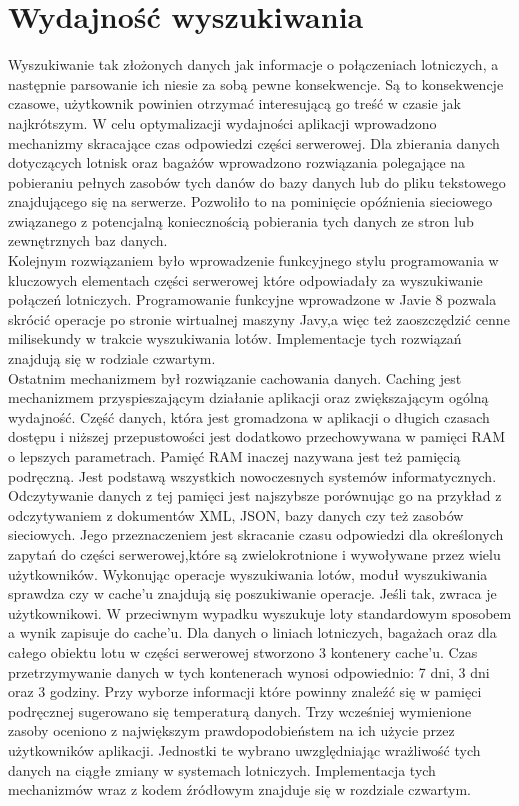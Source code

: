 \documentclass[12pt, twoside]{report}
\begin{document}
\section{Wydajność wyszukiwania}
Wyszukiwanie tak złożonych danych jak informacje o połączeniach lotniczych, a następnie parsowanie ich niesie za sobą pewne konsekwencje. Są to konsekwencje czasowe, użytkownik powinien otrzymać interesującą go treść w czasie jak najkrótszym. W celu optymalizacji wydajności aplikacji wprowadzono mechanizmy skracające czas odpowiedzi części serwerowej.
Dla zbierania danych dotyczących lotnisk oraz bagażów wprowadzono rozwiązania polegające na pobieraniu pełnych zasobów tych danów do bazy danych lub do pliku tekstowego znajdującego się na serwerze. Pozwoliło to na pominięcie opóźnienia sieciowego związanego z potencjalną koniecznością pobierania tych danych ze stron lub zewnętrznych baz danych.\\ \indent
Kolejnym rozwiązaniem było wprowadzenie funkcyjnego stylu programowania w kluczowych elementach części serwerowej które odpowiadały za wyszukiwanie połączeń lotniczych.  Programowanie funkcyjne wprowadzone w Javie 8 pozwala skrócić operacje po stronie wirtualnej maszyny Javy,a więc też zaoszczędzić cenne milisekundy w trakcie wyszukiwania lotów.
Implementacje tych rozwiązań znajdują się w rodziale czwartym.\\ \indent
Ostatnim mechanizmem był rozwiązanie cachowania danych. Caching jest mechanizmem przyspieszającym działanie aplikacji oraz zwiększającym ogólną wydajność. Część danych, która jest gromadzona w aplikacji o długich czasach dostępu i niższej przepustowości jest dodatkowo przechowywana w pamięci RAM o lepszych parametrach\cite{ehcache}. Pamięć RAM inaczej nazywana jest też pamięcią podręczną. Jest podstawą wszystkich nowoczesnych systemów informatycznych. Odczytywanie danych z tej pamięci jest najszybsze porównując go na przykład z odczytywaniem z dokumentów XML, JSON, bazy danych czy też zasobów sieciowych. Jego przeznaczeniem jest skracanie czasu odpowiedzi dla określonych zapytań do części serwerowej,które są zwielokrotnione i wywoływane przez wielu użytkowników. Wykonując operacje wyszukiwania lotów, moduł wyszukiwania sprawdza czy w cache'u znajdują się poszukiwanie operacje. Jeśli tak, zwraca je użytkownikowi. W przeciwnym wypadku  wyszukuje loty standardowym sposobem a wynik zapisuje do cache'u. Dla danych o liniach lotniczych, bagażach oraz dla całego obiektu lotu w części serwerowej stworzono 3 kontenery cache'u. Czas przetrzymywanie danych w tych kontenerach wynosi odpowiednio: 7 dni, 3 dni oraz 3 godziny. Przy wyborze informacji które powinny znaleźć się w pamięci podręcznej sugerowano się temperaturą danych. Trzy wcześniej wymienione zasoby oceniono z największym prawdopodobieństem na ich użycie przez użytkowników aplikacji.
Jednostki te wybrano uwzględniając wrażliwość tych danych na ciągłe zmiany w systemach lotniczych. Implementacja tych mechanizmów wraz z kodem źródłowym znajduje się w rozdziale czwartym.
\newpage
\end{document}
